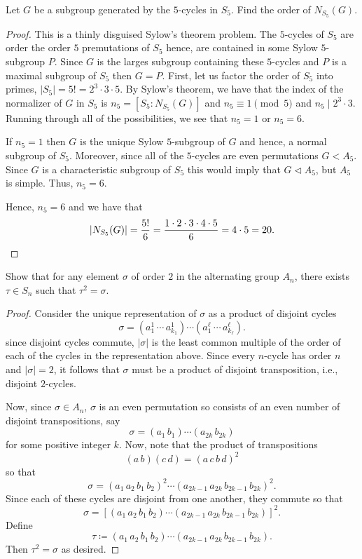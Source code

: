 \begin{problem}
Let $G$ be a subgroup generated by the $5$-cycles in $S_5$. Find the order
of $N_{S_5}(G)$.
\end{problem}
\begin{proof}
This is a thinly disguised Sylow's theorem problem. The $5$-cycles of $S_5$
are order the order $5$ premutations of $S_5$ hence, are contained in some
Sylow $5$-subgroup $P$. Since $G$ is the larges subgroup containing these
$5$-cycles and $P$ is a maximal subgroup of $S_5$ then $G=P$. First, let us
factor the order of $S_5$ into primes, $|S_5|=5!=2^3\cdot 3\cdot 5$. By
Sylow's theorem, we have that the index of the normalizer of $G$ in $S_5$
is $n_5=[S_5:N_{S_5}(G)]$ and $n_5\equiv 1\pmod{5}$ and $n_5\mid 2^3\cdot
3$. Running through all of the possibilities, we see that $n_5=1$ or
$n_5=6$.

If $n_5=1$ then $G$ is the unique Sylow $5$-subgroup of $G$ and hence, a
normal subgroup of $S_5$. Moreover, since all of the $5$-cycles are even
permutations $G<A_5$. Since $G$ is a characteristic subgroup of $S_5$ this
would imply that $G\lhd A_5$, but $A_5$ is simple. Thus, $n_5=6$.

Hence, $n_5=6$ and we have that
\[
|N_{S_5}(G)|=\frac{5!}{6}=\frac{1\cdot 2\cdot 3\cdot 4\cdot 5}{6}=4\cdot 5=20.\qedhere
\]
\end{proof}

\begin{problem}
Show that for any element $\sigma$ of order $2$ in the
alternating group $A_n$, there exists $\tau\in S_n$ such that
$\tau^2=\sigma$.
\end{problem}
\begin{proof}
Consider the unique representation of $\sigma$ as a product of disjoint
cycles
\[
\sigma=(a^1_1\,\cdots\,a^1_{k_1})\cdots (a^\ell_1\,\cdots\,a^\ell_{k_\ell}).
\]
since disjoint cycles commute, $|\sigma|$ is the least common multiple of
the order of each of the cycles in the representation above. Since every
$n$-cycle has order $n$ and $|\sigma|=2$, it follows that $\sigma$ must be
a product of disjoint transposition, i.e., disjoint $2$-cycles.

Now, since $\sigma\in A_n$, $\sigma$ is an even permutation so consists of
an even number of disjoint transpositions, say
\[
\sigma=(a_1\,b_1)\cdots(a_{2k}\,b_{2k})
\]
for some positive integer $k$. Now, note that the product of transpositions
\[
(a\,b)(c\,d)=(a\,c\,b\,d)^2
\]
so that
\[
\sigma=(a_1\,a_2\,b_1\,b_2)^2\cdots(a_{2k-1}\,a_{2k}\,b_{2k-1}\,b_{2k})^2.
\]
Since each of these cycles are disjoint from one another, they commute so
that
\[
\sigma=\left[(a_1\,a_2\,b_1\,b_2)\cdots(a_{2k-1}\,a_{2k}\,b_{2k-1}\,b_{2k})\right]^2.
\]
Define
\[
\tau\coloneqq(a_1\,a_2\,b_1\,b_2)\cdots(a_{2k-1}\,a_{2k}\,b_{2k-1}\,b_{2k}).
\]
Then $\tau^2=\sigma$ as desired.
\end{proof}


